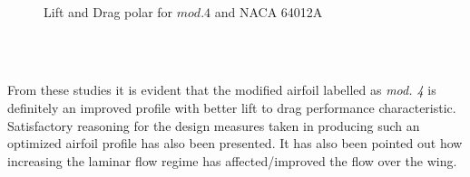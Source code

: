 \documentclass[main.tex]{subfiles}
\begin{document}
\begin{figure}[h!]
     \\
    \caption{Lift and Drag polar for $mod. 4$ and NACA 64012A}\vspace*{-1.5em}
    \label{fig7}
\end{figure}\\
\\\par From these studies it is evident that the modified airfoil labelled as \textit{mod. 4} is definitely an improved profile with better lift to drag performance characteristic. Satisfactory reasoning for the design measures taken in producing such an optimized airfoil profile has also been presented. It has also been pointed out how increasing the laminar flow regime has affected/improved the flow over the wing.

\printbibliography[title={References}]
\end{document}
